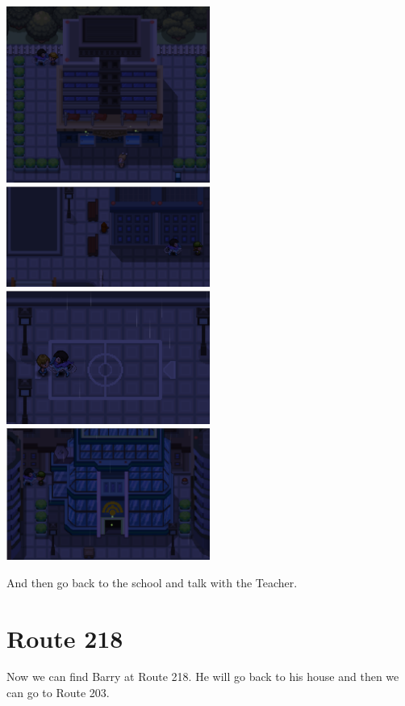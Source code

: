 \documentclass[11pt]{article}
\begin{document}
\includegraphics[width=0.5\textwidth]{walkthrough/Sinnoh/Jubilife-student-1}
\includegraphics[width=0.5\textwidth]{walkthrough/Sinnoh/Jubilife-student-2}
\includegraphics[width=0.5\textwidth]{walkthrough/Sinnoh/Jubilife-student-3}
\includegraphics[width=0.5\textwidth]{walkthrough/Sinnoh/Jubilife-student-4}

And then go back to the school and talk with the Teacher.

\section{Route 218}\label{sec:Route_218}
Now we can find Barry at Route 218.
He will go back to his house and then we can go to Route 203.
\end{document}
